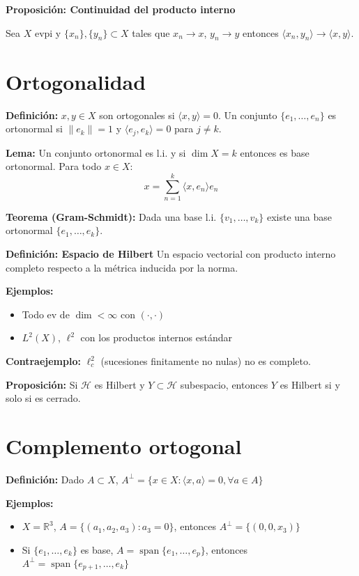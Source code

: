 \documentclass{article}
\begin{document}
\textbf{Proposición: Continuidad del producto interno}

Sea $X$ evpi y $\{x_n\}, \{y_n\} \subset X$ tales que $x_n \to x$, $y_n \to y$ entonces $\langle x_n, y_n \rangle \to \langle x, y \rangle$.

\section*{Ortogonalidad}

\textbf{Definición:} $x, y \in X$ son ortogonales si $\langle x, y \rangle = 0$. Un conjunto $\{e_1, \dots, e_n\}$ es ortonormal si $\|e_k\| = 1$ y $\langle e_j, e_k \rangle = 0$ para $j \neq k$.

\textbf{Lema:} Un conjunto ortonormal es l.i. y si $\dim X = k$ entonces es base ortonormal. Para todo $x \in X$:
\[
x = \sum_{n=1}^k \langle x, e_n \rangle e_n
\]

\textbf{Teorema (Gram-Schmidt):} Dada una base l.i. $\{v_1, \dots, v_k\}$ existe una base ortonormal $\{e_1, \dots, e_k\}$.

\textbf{Definición: Espacio de Hilbert} Un espacio vectorial con producto interno completo respecto a la métrica inducida por la norma.

\textbf{Ejemplos:}
\begin{itemize}
    \item Todo ev de $\dim < \infty$ con $(\cdot, \cdot)$
    \item $L^2(X)$, $\ell^2$ con los productos internos estándar
\end{itemize}

\textbf{Contraejemplo:} $\ell^2_c$ (sucesiones finitamente no nulas) no es completo.

\textbf{Proposición:} Si $\mathcal{H}$ es Hilbert y $Y \subset \mathcal{H}$ subespacio, entonces $Y$ es Hilbert si y solo si es cerrado.

\section*{Complemento ortogonal}

\textbf{Definición:} Dado $A \subset X$, $A^\perp = \{x \in X : \langle x, a \rangle = 0, \forall a \in A\}$

\textbf{Ejemplos:}
\begin{itemize}
    \item $X = \mathbb{R}^3$, $A = \{(a_1, a_2, a_3) : a_3 = 0\}$, entonces $A^\perp = \{(0, 0, x_3)\}$
    \item Si $\{e_1, \dots, e_k\}$ es base, $A = \operatorname{span}\{e_1, \dots, e_p\}$, entonces $A^\perp = \operatorname{span}\{e_{p+1}, \dots, e_k\}$
\end{itemize}
\end{document}
